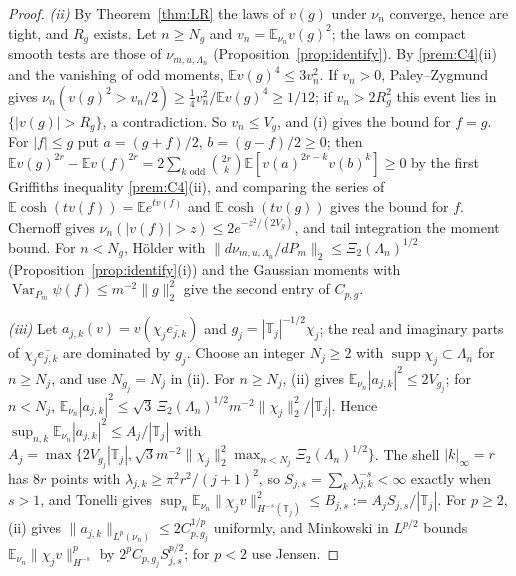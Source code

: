 \documentclass[11pt]{article}
\theoremstyle{plain}
\theoremstyle{definition}
\theoremstyle{remark}
\newcommand{\E}{\mathbb{E}}
\newcommand{\T}{\mathbb{T}}
\newcommand{\conj}[1]{\overline{#1}}
\DeclareMathOperator{\supp}{supp}
\DeclareMathOperator{\Var}{Var}
\begin{document}
\begin{proof}
\emph{(ii)} By Theorem~\ref{thm:LR} the laws of $v(g)$ under $\nu_n$ converge, hence
are tight, and $R_g$ exists. Let $n\ge N_g$ and $v_n=\E_{\nu_n}v(g)^{2}$; the laws on compact
smooth tests are those of $\nu_{m,u,\Lambda_n}$ (Proposition~\ref{prop:identify}). By
\ref{prem:C4}(ii) and the vanishing of odd moments,
$\E v(g)^{4}\le3v_n^{2}$. If $v_n>0$, Paley--Zygmund gives
$\nu_n(v(g)^{2}>v_n/2)\ge\tfrac14v_n^{2}/\E v(g)^{4}\ge1/12$; if $v_n>2R_g^{2}$ this event lies in
$\{|v(g)|>R_g\}$, a contradiction. So $v_n\le V_g$, and (i) gives the bound for $f=g$.
For $|f|\le g$ put $a=(g+f)/2$, $b=(g-f)/2\ge0$; then
$\E v(g)^{2r}-\E v(f)^{2r}=2\sum_{k\text{ odd}}\binom{2r}{k}\E[v(a)^{2r-k}v(b)^{k}]\ge0$ by the first
Griffiths inequality \ref{prem:C4}(ii), and comparing the series of
$\E\cosh(tv(f))=\E e^{tv(f)}$ and $\E\cosh(tv(g))$ gives the bound for $f$. Chernoff gives
$\nu_n(|v(f)|>z)\le2e^{-z^{2}/(2V_g)}$, and tail integration the moment bound. For
$n<N_g$, H\"older with $\|d\nu_{m,u,\Lambda_n}/dP_m\|_2\le\Xi_2(\Lambda_n)^{1/2}$
(Proposition~\ref{prop:identify}(i)) and the Gaussian moments with
$\Var_{P_m}\psi(f)\le m^{-2}\|g\|_2^{2}$ give the second entry of $C_{p,g}$.

\emph{(iii)} Let $a_{j,k}(v)=v(\chi_j\conj{e_{j,k}})$ and $g_j=|\T_j|^{-1/2}\chi_j$; the real and
imaginary parts of $\chi_j\conj{e_{j,k}}$ are dominated by $g_j$. Choose an integer
$N_j\ge2$ with $\supp\chi_j\subset\Lambda_n$ for $n\ge N_j$, and use $N_{g_j}=N_j$ in (ii).
For $n\ge N_j$, (ii) gives $\E_{\nu_n}|a_{j,k}|^{2}\le2V_{g_j}$; for $n<N_j$,
$\E_{\nu_n}|a_{j,k}|^{2}\le\sqrt3\,\Xi_2(\Lambda_n)^{1/2}m^{-2}\|\chi_j\|_2^{2}/|\T_j|$. Hence
$\sup_{n,k}\E_{\nu_n}|a_{j,k}|^{2}\le A_j/|\T_j|$ with
$A_j=\max\{2V_{g_j}|\T_j|,\sqrt3m^{-2}\|\chi_j\|_2^{2}\max_{n<N_j}\Xi_2(\Lambda_n)^{1/2}\}$. The shell
$|k|_\infty=r$ has $8r$ points with $\lambda_{j,k}\ge\pi^{2}r^{2}/(j+1)^{2}$, so
$S_{j,s}=\sum_k\lambda_{j,k}^{-s}<\infty$ exactly when $s>1$, and Tonelli gives
$\sup_n\E_{\nu_n}\|\chi_jv\|^{2}_{H^{-s}(\T_j)}\le B_{j,s}:=A_jS_{j,s}/|\T_j|$. For $p\ge2$, (ii)
gives $\|a_{j,k}\|_{L^{p}(\nu_n)}\le2C_{p,g_j}^{1/p}$ uniformly, and Minkowski in $L^{p/2}$
bounds $\E_{\nu_n}\|\chi_jv\|^{p}_{H^{-s}}$ by $2^{p}C_{p,g_j}S_{j,s}^{p/2}$; for $p<2$ use Jensen.


\end{proof}
\end{document}
